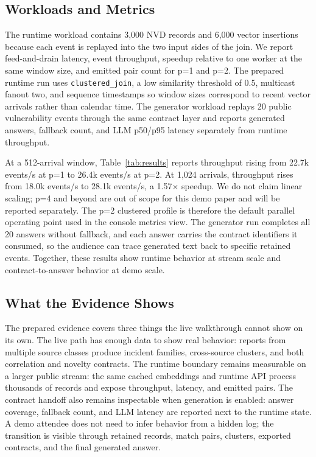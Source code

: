 \documentclass[sigconf,anonymous]{acmart}
\begin{document}
\subsection{Workloads and Metrics}

The runtime workload contains 3,000 NVD records and 6,000 vector insertions because each event is replayed into the two input sides of the join. We report feed-and-drain latency, event throughput, speedup relative to one worker at the same window size, and emitted pair count for p=1 and p=2. The prepared runtime run uses \texttt{clustered\_join}, a low similarity threshold of 0.5, multicast fanout two, and sequence timestamps so window sizes correspond to recent vector arrivals rather than calendar time. The generator workload replays 20 public vulnerability events through the same contract layer and reports generated answers, fallback count, and LLM p50/p95 latency separately from runtime throughput.

At a 512-arrival window, Table~\ref{tab:results} reports throughput rising from 22.7k events/s at p=1 to 26.4k events/s at p=2. At 1,024 arrivals, throughput rises from 18.0k events/s to 28.1k events/s, a 1.57$\times$ speedup. We do not claim linear scaling; p=4 and beyond are out of scope for this demo paper and will be reported separately. The p=2 clustered profile is therefore the default parallel operating point used in the console metrics view. The generator run completes all 20 answers without fallback, and each answer carries the contract identifiers it consumed, so the audience can trace generated text back to specific retained events. Together, these results show runtime behavior at stream scale and contract-to-answer behavior at demo scale.

\subsection{What the Evidence Shows}

The prepared evidence covers three things the live walkthrough cannot show on its own. The live path has enough data to show real behavior: reports from multiple source classes produce incident families, cross-source clusters, and both correlation and novelty contracts. The runtime boundary remains measurable on a larger public stream: the same cached embeddings and runtime API process thousands of records and expose throughput, latency, and emitted pairs. The contract handoff also remains inspectable when generation is enabled: answer coverage, fallback count, and LLM latency are reported next to the runtime state. A demo attendee does not need to infer behavior from a hidden log; the transition is visible through retained records, match pairs, clusters, exported contracts, and the final generated answer.
\end{document}
